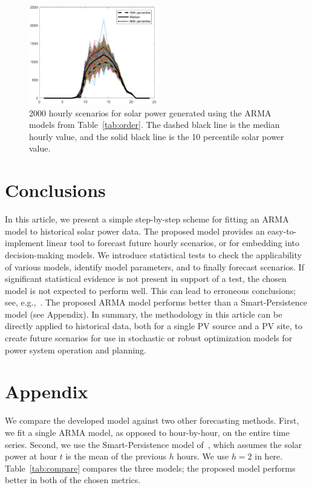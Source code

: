 \documentclass[11pt]{article} %
\begin{document}
\begin{figure}[!t]
	\centering
	\includegraphics[width=0.5\textwidth]{sample_smooth.eps}
	\caption{2000 hourly scenarios for solar power generated using the ARMA models 
		from Table~\ref{tab:order}. The dashed black line is the median hourly value, 
		and the solid black line is
		the 10 percentile solar power value.}
	\label{fig:sample}
\end{figure}

\section{Conclusions}
In this article, we present a simple step-by-step scheme for fitting an ARMA 
model to 
historical solar power data. The proposed model provides an easy-to-implement 
linear tool to forecast future hourly scenarios, or for embedding into 
decision-making models. 
We introduce statistical tests to check the applicability of various models, 
identify model parameters, and to finally forecast scenarios. If significant  statistical evidence is not present in support of a  test, the chosen model is not expected to perform well. This can lead to 
erroneous conclusions; see, 
e.g.,~\cite{kwiatkowski1992testing,phillips1988testing}. 
The proposed ARMA model performs better than a Smart-Persistence model (see Appendix). 
In summary, the methodology in this article can be directly applied to historical data,  both for a single PV source and a PV site,
to create future scenarios for use in stochastic or robust optimization models 
for power system operation and planning. 


\section*{Appendix} \label{sec:appendix}

We compare the developed model against two other forecasting methods. First, we 
fit a single ARMA model, as opposed to hour-by-hour, on the entire time series. 
Second, we use the Smart-Persistence model of~\cite{lauret2016solar}, which 
assumes the solar power at hour $t$ is the mean of the previous $h$ hours. We 
use $h=2$ in here.
Table~\ref{tab:compare} compares the three models; the proposed model performs 
better in both of the chosen metrics. 
\end{document}
